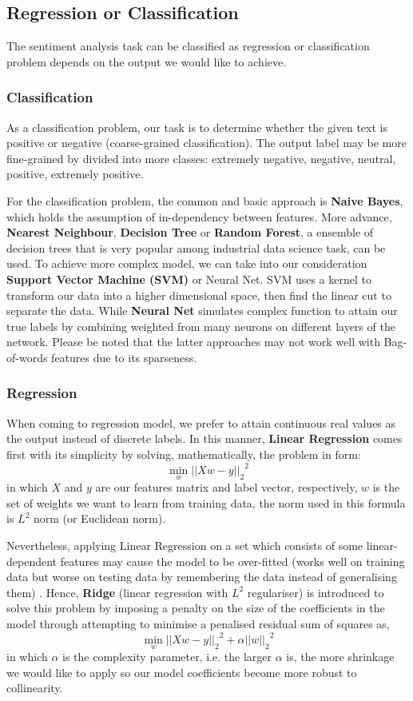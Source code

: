 \documentclass[12pt]{article}
\begin{document}
\subsection{Regression or Classification}

The sentiment analysis task can be classified as regression or classification problem depends on the output we would like to achieve.

\subsubsection{Classification}
As a classification problem, our task is to determine whether the given text is positive or negative (coarse-grained classification). The output label may be more fine-grained by divided into more classes: extremely negative, negative, neutral, positive, extremely positive.

For the classification problem, the common and basic approach is \textbf{Naive Bayes}, which holds the assumption of in-dependency between features. More advance, \textbf{Nearest Neighbour}, \textbf{Decision Tree} or \textbf{Random Forest}, a ensemble of decision trees that is very popular among industrial data science task, can be used. To achieve more complex model, we can take into our consideration \textbf{Support Vector Machine (SVM)} or Neural Net. SVM uses a kernel to transform our data into a higher dimensional space, then find the linear cut to separate the data. While \textbf{Neural Net} simulates complex function to attain our true labels by combining weighted from many neurons on different layers of the network. Please be noted that the latter approaches may not work well with Bag-of-words features due to its sparseness.

\subsubsection{Regression}

When coming to regression model, we prefer to attain continuous real values as the output instead of discrete labels. In this manner, \textbf{Linear Regression} comes first with its simplicity by solving, mathematically, the problem in form:
\[\min_w{||Xw-y||_2}^2\]
in which $X$ and $y$ are our features matrix and label vector, respectively, $w$ is the set of weights we want to learn from training data, the norm used in this formula is $L^2$ norm (or Euclidean norm).

Nevertheless, applying Linear Regression on a set which consists of some linear-dependent features may cause the model to be over-fitted (works well on training data but worse on testing data by remembering the data instead of generalising them) . Hence, \textbf{Ridge} (linear regression with $L^2$ regulariser) is introduced to solve this problem by imposing a penalty on the size of the coefficients in the model through attempting to minimise a penalised residual sum of squares as,
\[\min_w{||Xw-y||_2}^2+\alpha{||w||_2}^2 \]
in which $\alpha$ is the complexity parameter, i.e. the larger $\alpha$ is, the more shrinkage we would like to apply so our model coefficients become more robust to collinearity.
\end{document}
